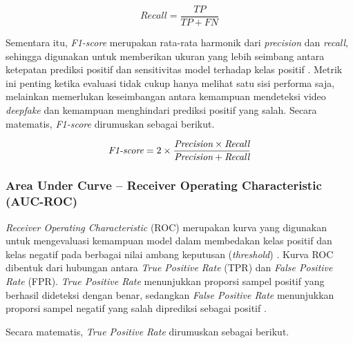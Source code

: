 \vspace{0.5\baselineskip}
\begin{equation}
\mathrm{\textit{Recall}} = \frac{TP}{TP + FN}
\label{eq:recall}
\end{equation}
\vspace{0.5\baselineskip}

Sementara itu, \textit{F1-score} merupakan rata-rata harmonik dari \textit{precision} dan \textit{recall}, sehingga digunakan untuk memberikan ukuran yang lebih seimbang antara ketepatan prediksi positif dan sensitivitas model terhadap kelas positif \cite{SOKOLOVA2009427,powers2020evaluationprecisionrecallfmeasure}. Metrik ini penting ketika evaluasi tidak cukup hanya melihat satu sisi performa saja, melainkan memerlukan keseimbangan antara kemampuan mendeteksi video \textit{deepfake} dan kemampuan menghindari prediksi positif yang salah. Secara matematis, \textit{F1-score} dirumuskan sebagai berikut.

\vspace{0.5\baselineskip}
\begin{equation}
\mathrm{\textit{F1\mbox{-}score}} = 2 \times \frac{\mathrm{\textit{Precision}} \times \mathrm{\textit{Recall}}}{\mathrm{\textit{Precision}} + \mathrm{\textit{Recall}}}
\label{eq:f1-score}
\end{equation}
\vspace{0.5\baselineskip}

\subsubsection{Area Under Curve -- Receiver Operating Characteristic (AUC-ROC)} \label{II.Teori7.4}
\textit{Receiver Operating Characteristic} (ROC) merupakan kurva yang digunakan untuk mengevaluasi kemampuan model dalam membedakan kelas positif dan kelas negatif pada berbagai nilai ambang keputusan (\textit{threshold}) \cite{FAWCETT2006861,powers2020evaluationprecisionrecallfmeasure}. Kurva ROC dibentuk dari hubungan antara \textit{True Positive Rate} (TPR) dan \textit{False Positive Rate} (FPR). \textit{True Positive Rate} menunjukkan proporsi sampel positif yang berhasil dideteksi dengan benar, sedangkan \textit{False Positive Rate} menunjukkan proporsi sampel negatif yang salah diprediksi sebagai positif \cite{FAWCETT2006861}. \par

Secara matematis, \textit{True Positive Rate} dirumuskan sebagai berikut.

